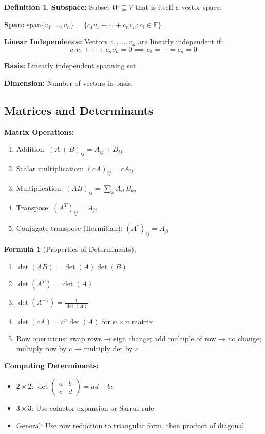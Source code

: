 \documentclass[12pt,a4paper]{article}
\theoremstyle{definition}
\newtheorem{definition}[theorem]{Definition}
\newtheorem{formula}[theorem]{Formula}
\begin{document}
\begin{definition}
\textbf{Subspace:} Subset $W \subseteq V$ that is itself a vector space.

\textbf{Span:} $\text{span}\{v_1, \ldots, v_n\} = \{c_1v_1 + \cdots + c_nv_n : c_i \in \mathbb{F}\}$

\textbf{Linear Independence:} Vectors $v_1, \ldots, v_n$ are linearly independent if:
\[
c_1v_1 + \cdots + c_nv_n = 0 \implies c_1 = \cdots = c_n = 0
\]

\textbf{Basis:} Linearly independent spanning set.

\textbf{Dimension:} Number of vectors in basis.
\end{definition}

\subsection{Matrices and Determinants}

\begin{importantbox}
\textbf{Matrix Operations:}
\begin{enumerate}
    \item Addition: $(A + B)_{ij} = A_{ij} + B_{ij}$
    \item Scalar multiplication: $(cA)_{ij} = cA_{ij}$
    \item Multiplication: $(AB)_{ij} = \sum_k A_{ik}B_{kj}$
    \item Transpose: $(A^T)_{ij} = A_{ji}$
    \item Conjugate transpose (Hermitian): $(A^\dagger)_{ij} = \overline{A_{ji}}$
\end{enumerate}
\end{importantbox}

\begin{formula}[Properties of Determinants]
\begin{enumerate}
    \item $\det(AB) = \det(A)\det(B)$
    \item $\det(A^T) = \det(A)$
    \item $\det(A^{-1}) = \frac{1}{\det(A)}$
    \item $\det(cA) = c^n\det(A)$ for $n \times n$ matrix
    \item Row operations: swap rows → sign change; add multiple of row → no change; multiply row by $c$ → multiply det by $c$
\end{enumerate}
\end{formula}

\begin{tipbox}
\textbf{Computing Determinants:}
\begin{itemize}
    \item $2 \times 2$: $\det\begin{pmatrix}a & b \\ c & d\end{pmatrix} = ad - bc$
    \item $3 \times 3$: Use cofactor expansion or Sarrus rule
    \item General: Use row reduction to triangular form, then product of diagonal
\end{itemize}
\end{tipbox}
\end{document}
